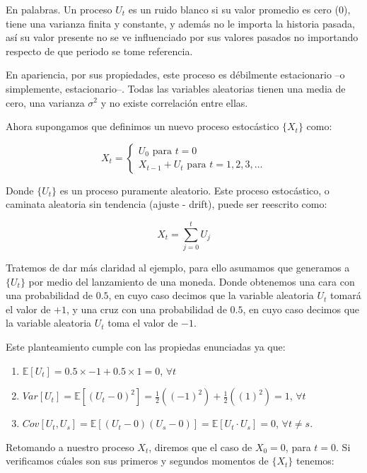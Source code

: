 \documentclass[
  a4paper,
]{article}
\begin{document}
En palabras. Un proceso \(U_t\) es un ruido blanco si su valor promedio
es cero (0), tiene una varianza finita y constante, y además no le
importa la historia pasada, así su valor presente no se ve influenciado
por sus valores pasados no importando respecto de que periodo se tome
referencia.

En apariencia, por sus propiedades, este proceso es débilmente
estacionario --o simplemente, estacionario--. Todas las variables
aleatorias tienen una media de cero, una varianza \(\sigma^2\) y no
existe correlación entre ellas.

Ahora supongamos que definimos un nuevo proceso estocástico \(\{X_t\}\)
como:

\[
X_t = \left\{ \begin{array}{l} U_0  \mbox{ para } t = 0 \\ X_{t-1} + U_t \mbox{ para } t = 1, 2, 3, \ldots \end{array}\right.
\]

Donde \(\{ U_t \}\) es un proceso puramente aleatorio. Este proceso
estocástico, o caminata aleatoria sin tendencia (ajuste - drift), puede
ser reescrito como:

\[
X_t = \sum^t_{j = 0} U_j
\]

Tratemos de dar más claridad al ejemplo, para ello asumamos que
generamos a \(\{U_t\}\) por medio del lanzamiento de una moneda. Donde
obtenemos una cara con una probabilidad de \(0.5\), en cuyo caso decimos
que la variable aleatoria \(U_t\) tomará el valor de \(+1\), y una cruz
con una probabilidad de \(0.5\), en cuyo caso decimos que la variable
aleatoria \(U_t\) toma el valor de \(-1\).

Este planteamiento cumple con las propiedas enunciadas ya que:

\begin{enumerate}
\def\labelenumi{\arabic{enumi}.}
\item
  \(\mathbb{E}[U_t] = 0.5 \times -1 + 0.5 \times 1 = 0\), \(\forall t\)
\item
  \(Var[U_t] = \mathbb{E}[(U_t - 0)^2] = \frac{1}{2}((-1)^2) + \frac{1}{2}((1)^2) = 1\),
  \(\forall t\)
\item
  \(Cov[U_t,U_s] = \mathbb{E}[(U_t - 0)(U_s - 0)] = \mathbb{E}[U_t \cdot U_s] = 0\),
  \(\forall t \neq s\).
\end{enumerate}

Retomando a nuestro proceso \(X_t\), diremos que el caso de \(X_0 = 0\),
para \(t = 0\). Si verificamos cúales son sus primeros y segundos
momentos de \(\{X_t\}\) tenemos:
\end{document}
